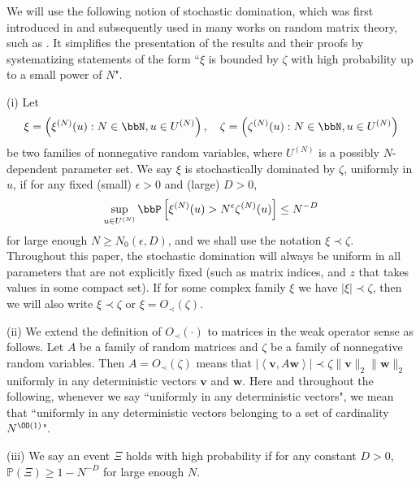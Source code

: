 We will use the following notion of stochastic domination, which was first introduced in \cite{Average_fluc} and subsequently used in many works on random matrix theory, such as \cite{isotropic,principal,local_circular,Delocal,Semicircle,Anisotropic}. It simplifies the presentation of the results and their proofs by systematizing statements of the form ``$\xi$ is bounded by $\zeta$ with high probability up to a small power of $N$".

\begin{definition}\label{stoch_domination}
(i) Let
\[\xi=\left(\xi^{(N)}(u):N\in\bbN, u\in U^{(N)}\right),\hskip 10pt \zeta=\left(\zeta^{(N)}(u):N\in\bbN, u\in U^{(N)}\right)\]
be two families of nonnegative random variables, where $U^{(N)}$ is a possibly $N$-dependent parameter set. We say $\xi$ is stochastically dominated by $\zeta$, uniformly in $u$, if for any fixed (small) $\epsilon>0$ and (large) $D>0$, 
\[\sup_{u\in U^{(N)}}\bbP\left[\xi^{(N)}(u)>N^\epsilon\zeta^{(N)}(u)\right]\le N^{-D}\]
for large enough $N\ge N_0(\epsilon, D)$, and we shall use the notation $\xi\prec\zeta$. Throughout this paper, the stochastic domination will always be uniform in all parameters that are not explicitly fixed (such as matrix indices, and $z$ that takes values in some compact set). 
If for some complex family $\xi$ we have $|\xi|\prec\zeta$, then we will also write $\xi \prec \zeta$ or $\xi=O_\prec(\zeta)$.

(ii) We extend the definition of $O_\prec(\cdot)$ to matrices in the weak operator sense as follows. Let $A$ be a family of random matrices and $\zeta$ be a family of nonnegative random variables. Then $A=O_\prec(\zeta)$ means that $\left|\left\langle\mathbf v, A\mathbf w\right\rangle\right|\prec\zeta \| \mathbf v\|_2 \|\mathbf w\|_2 $ uniformly in any deterministic vectors $\mathbf v$ and $\mathbf w$. Here and throughout the following, whenever we say ``uniformly in any deterministic vectors", we mean that ``uniformly in any deterministic vectors belonging to a set of cardinality $N^{\OO(1)}$".

(iii) We say an event $\Xi$ holds with high probability if for any constant $D>0$, $\mathbb P(\Xi)\ge 1- N^{-D}$ for large enough $N$.
\end{definition}

